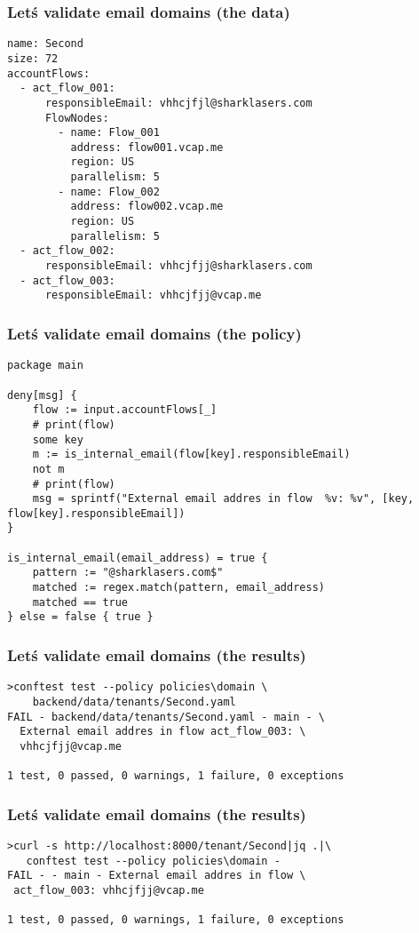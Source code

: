 \documentclass{beamer}
\begin{document}
\begin{frame}[fragile]
\frametitle{Let\'s validate email domains (the data)}
\begin{verbatim}
name: Second
size: 72
accountFlows:
  - act_flow_001: 
      responsibleEmail: vhhcjfjl@sharklasers.com
      FlowNodes:
        - name: Flow_001
          address: flow001.vcap.me
          region: US
          parallelism: 5
        - name: Flow_002
          address: flow002.vcap.me
          region: US
          parallelism: 5
  - act_flow_002: 
      responsibleEmail: vhhcjfjj@sharklasers.com
  - act_flow_003:
      responsibleEmail: vhhcjfjj@vcap.me
\end{verbatim}
\end{frame}

\begin{frame}[fragile]
\frametitle{Let\'s validate email domains (the policy)}
\begin{verbatim}
package main

deny[msg] {
    flow := input.accountFlows[_]
    # print(flow)
    some key
    m := is_internal_email(flow[key].responsibleEmail)
    not m
    # print(flow)
    msg = sprintf("External email addres in flow  %v: %v", [key, flow[key].responsibleEmail])
}

is_internal_email(email_address) = true {
    pattern := "@sharklasers.com$"
    matched := regex.match(pattern, email_address)
    matched == true 
} else = false { true }
\end{verbatim}
\end{frame}

\begin{frame}[fragile]
\frametitle{Let\'s validate email domains (the results)}
\begin{verbatim}
>conftest test --policy policies\domain \
    backend/data/tenants/Second.yaml
FAIL - backend/data/tenants/Second.yaml - main - \
  External email addres in flow act_flow_003: \
  vhhcjfjj@vcap.me

1 test, 0 passed, 0 warnings, 1 failure, 0 exceptions

\end{verbatim} 

\end{frame}

\begin{frame}[fragile]
\frametitle{Let\'s validate email domains (the results)}
\begin{verbatim}
>curl -s http://localhost:8000/tenant/Second|jq .|\ 
   conftest test --policy policies\domain -
FAIL - - main - External email addres in flow \
 act_flow_003: vhhcjfjj@vcap.me

1 test, 0 passed, 0 warnings, 1 failure, 0 exceptions

\end{verbatim} 

\end{frame}
\end{document}
